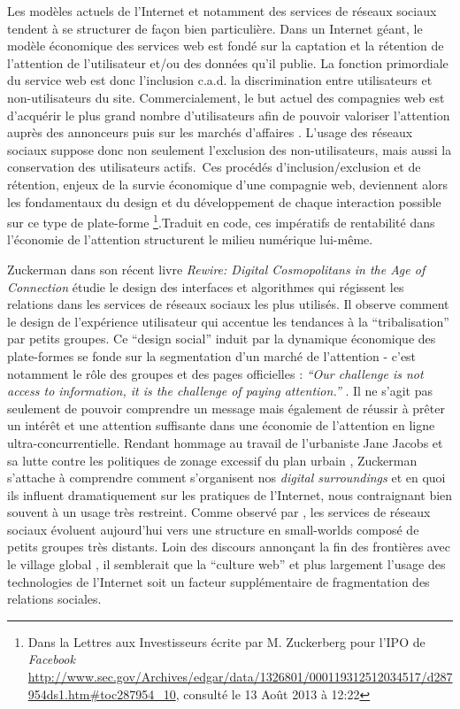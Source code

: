 Les modèles actuels de l’Internet et notamment des services de réseaux sociaux tendent à se structurer de façon bien particulière. Dans un Internet géant, le modèle économique des services web est fondé sur la captation et la rétention de l'attention de l'utilisateur et/ou des données qu'il publie. La fonction primordiale du service web est donc l'inclusion c.a.d. la discrimination entre utilisateurs et non-utilisateurs du site. Commercialement, le but actuel des compagnies web est d'acquérir le plus grand nombre d'utilisateurs afin de pouvoir valoriser l’attention auprès des annonceurs puis sur les marchés d’affaires \citep{Ries2011}. L'usage des réseaux sociaux suppose donc non seulement l'exclusion des non-utilisateurs, mais aussi la conservation des utilisateurs actifs. Ces procédés d'inclusion/exclusion et de rétention, enjeux de la survie économique d'une compagnie web, deviennent alors les fondamentaux du design et du développement de chaque interaction possible sur ce type de plate-forme
\footnote{Dans la Lettres aux Investisseurs écrite par M. Zuckerberg  pour l’IPO de \textit{Facebook} \url{http://www.sec.gov/Archives/edgar/data/1326801/000119312512034517/d287954ds1.htm\#toc287954_10}, consulté le 13 Août 2013 à 12:22}.Traduit en code, ces impératifs de rentabilité dans l’économie de l’attention structurent le milieu numérique lui-même.

Zuckerman dans son récent livre \textit{Rewire: Digital Cosmopolitans in the Age of Connection} étudie le design des interfaces et algorithmes qui régissent les relations dans les services de réseaux sociaux les plus utilisés. Il observe comment le design de l’expérience utilisateur qui accentue les tendances à la “tribalisation” par petits groupes. Ce ``design social'' induit par la dynamique économique des plate-formes se fonde sur la segmentation d’un marché de l’attention - c’est notamment le rôle des groupes et des pages officielles : \textit{``Our challenge is not access to information, it is the challenge of paying attention.''} \cite{Zuckerman2013}. Il ne s’agit pas seulement de pouvoir comprendre un message mais également de réussir à prêter un intérêt et une attention suffisante dans une économie de l’attention en ligne ultra-concurrentielle. Rendant hommage au travail de l’urbaniste Jane Jacobs et sa lutte contre les politiques de zonage excessif du plan urbain \citep{Jacobs1961}, Zuckerman s’attache à comprendre comment s’organisent nos \textit{digital surroundings} et en quoi ils influent dramatiquement sur les pratiques de l’Internet, nous contraignant bien souvent à un usage très restreint. Comme observé par \cite{Kumar2006}, les services de réseaux sociaux évoluent aujourd’hui vers une structure en small-worlds composé de petits groupes très distants. Loin des discours annonçant la fin des frontières avec le village global \citep{Breton1997}, il semblerait que la “culture web” et plus largement l’usage des technologies de l’Internet soit un facteur supplémentaire de fragmentation des relations sociales. 

